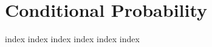 \chapter{Conditional Probability}
\label{ch:cp}
\ifdefined\HCode
\else
{
\startcontents[chapter]
}
\fi

{index}
{index}
{index}
{index}
{index}
{index}

\ifdefined\HCode
{}
\fi

\ifdefined\HCode
\else
{
\stopcontents[chapter]
}
\fi

\ifdefined\HCode
{}
\fi